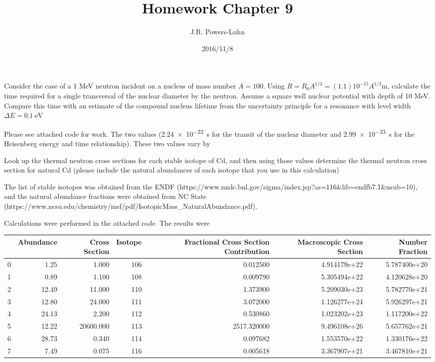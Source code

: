 \documentclass{hw}
\author{J.R. Powers-Luhn}
\date{2016/11/8}
\title{Homework Chapter 9}
\begin{document}
Consider the case of a 1 MeV neutron incident on a nucleus of mass number $A = 100$. Using $R=R_0 A^{1/3}=(1.1)10^{-15} A^{1/3}$m, calculate the time required for a single transversal of the nuclear diameter by the neutron. Assume a square well nuclear potential with depth of 10 MeV. Compare this time with an estimate of the compound nucleus lifetime from the uncertainty principle for a resonance with level width $\Delta E=\SI{0.1}{\electronvolt}$

\solution
Please see attached code for work. The two values (\SI{2.24e-22}{\second} for the transit of the nuclear diameter and \SI{2.99e-23}{\second} for the Heisenberg energy and time relationship). These two values vary by 

\problem{}
Look up the thermal neutron cross sections for each stable isotope of Cd, and then using those
values determine the thermal neutron cross section for natural Cd (please include the natural
abundances of each isotope that you use in this calculation)

\solution
The list of stable isotopes was obtained from the ENDF (https://www.nndc.bnl.gov/sigma/index.jsp?as=116&lib=endfb7.1&nsub=10), and the natural abundance fractions were obtained from NC State (https://www.ncsu.edu/chemistry/msf/pdf/IsotopicMass_NaturalAbundance.pdf).

Calculations were performed in the attached code. The results were

\begin{tabular}{lrrrrrr}
\toprule
{} &  Abundance &  Cross Section &  Isotope &  Fractional Cross Section Contribution &  Macroscopic Cross Section &  Number Fraction \\
\midrule
0 &       1.25 &          1.000 &      106 &                               0.012500 &               4.914179e+22 &     5.787400e+20 \\
1 &       0.89 &          1.100 &      108 &                               0.009790 &               5.305494e+22 &     4.120628e+20 \\
2 &      12.49 &         11.000 &      110 &                               1.373900 &               5.209030e+23 &     5.782770e+21 \\
3 &      12.80 &         24.000 &      111 &                               3.072000 &               1.126277e+24 &     5.926297e+21 \\
4 &      24.13 &          2.200 &      112 &                               0.530860 &               1.023202e+23 &     1.117200e+22 \\
5 &      12.22 &      20600.000 &      113 &                            2517.320000 &               9.496108e+26 &     5.657762e+21 \\
6 &      28.73 &          0.340 &      114 &                               0.097682 &               1.553570e+22 &     1.330176e+22 \\
7 &       7.49 &          0.075 &      116 &                               0.005618 &               3.367907e+21 &     3.467810e+21 \\
\bottomrule
\end{tabular}
\end{document}
